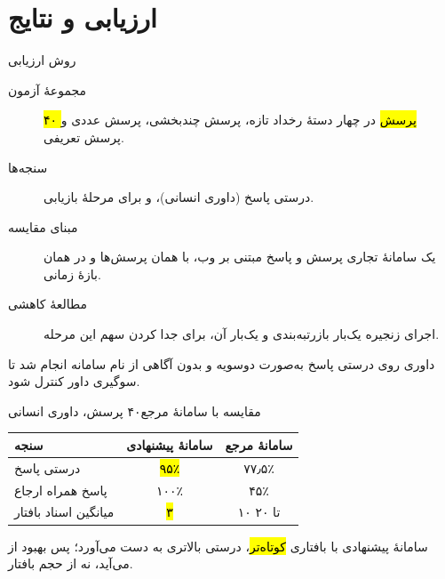 \section{ارزیابی و نتایج}

\begin{frame}{روش ارزیابی}
  \begin{description}
    \item[مجموعهٔ آزمون] \hl{۴۰ پرسش} در چهار دستهٔ رخداد تازه، پرسش چندبخشی،
          پرسش عددی و پرسش تعریفی.
    \item[سنجه‌ها] درستی پاسخ (داوری انسانی)،  و 
          برای مرحلهٔ بازیابی.
    \item[مبنای مقایسه] یک سامانهٔ تجاری پرسش و پاسخ مبتنی بر وب، با همان
          پرسش‌ها و در همان بازهٔ زمانی.
    \item[مطالعهٔ کاهشی] اجرای زنجیره یک‌بار  بازرتبه‌بندی و یک‌بار
           آن، برای جدا کردن سهم این مرحله.
  \end{description}

  \begin{PTnote}
    داوری روی درستی پاسخ به‌صورت دوسویه و بدون آگاهی از نام سامانه انجام شد تا
    سوگیری داور کنترل شود.
  \end{PTnote}
\end{frame}

\begin{frame}{مقایسه با سامانهٔ مرجع}{۴۰ پرسش، داوری انسانی}
  \begin{center}
    \small
    \begin{tabular}{@{}lcc@{}}
      \toprule
      سنجه & سامانهٔ پیشنهادی & سامانهٔ مرجع \\
      \midrule
      درستی پاسخ            & \hl{۹۵٪}   & ۷۷٫۵٪ \\
      پاسخ همراه ارجاع      & ۱۰۰٪       & ۴۵٪   \\
      میانگین اسناد بافتار  & \hl{۳}     & ۱۰ تا ۲۰ \\
      \bottomrule
    \end{tabular}
  \end{center}

  \begin{PTresult}
    سامانهٔ پیشنهادی با بافتاری \hl{کوتاه‌تر}، درستی بالاتری به دست می‌آورد؛ پس
    بهبود از  می‌آید، نه از حجم بافتار.
  \end{PTresult}
\end{frame}

